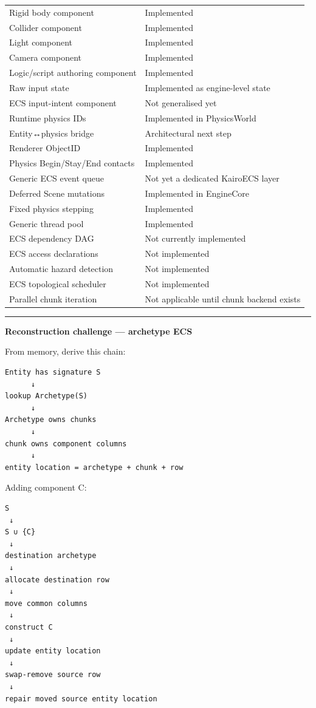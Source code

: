 {\begin{longtable}[]{@{}
  >{\raggedright\arraybackslash}p{}
  >{\raggedright\arraybackslash}p{}@{}}
Rigid body component & Implemented \\
Collider component & Implemented \\
Light component & Implemented \\
Camera component & Implemented \\
Logic/script authoring component & Implemented \\
Raw input state & Implemented as engine-level state \\
ECS input-intent component & Not generalised yet \\
Runtime physics IDs & Implemented in PhysicsWorld \\
Entity↔physics bridge & Architectural next step \\
Renderer ObjectID & Implemented \\
Physics Begin/Stay/End contacts & Implemented \\
Generic ECS event queue & Not yet a dedicated KairoECS layer \\
Deferred Scene mutations & Implemented in EngineCore \\
Fixed physics stepping & Implemented \\
Generic thread pool & Implemented \\
ECS dependency DAG & Not currently implemented \\
ECS access declarations & Not implemented \\
Automatic hazard detection & Not implemented \\
ECS topological scheduler & Not implemented \\
Parallel chunk iteration & Not applicable until chunk backend exists \\
\end{longtable}
}

\begin{center}\rule{0.5\linewidth}{0.5pt}\end{center}

\textbf{Reconstruction challenge --- archetype ECS}

From memory, derive this chain:

\begin{verbatim}
Entity has signature S
      ↓
lookup Archetype(S)
      ↓
Archetype owns chunks
      ↓
chunk owns component columns
      ↓
entity location = archetype + chunk + row
\end{verbatim}

Adding component C:

\begin{verbatim}
S
 ↓
S ∪ {C}
 ↓
destination archetype
 ↓
allocate destination row
 ↓
move common columns
 ↓
construct C
 ↓
update entity location
 ↓
swap-remove source row
 ↓
repair moved source entity location
\end{verbatim}


